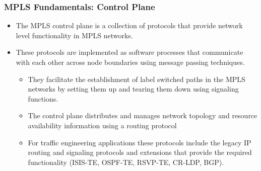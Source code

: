 \documentclass[12pt]{beamer}
\begin{document}
\begin{frame}
	\frametitle{MPLS Fundamentals: Control Plane}
	\begin{itemize}
	    \item The MPLS control plane is a collection of protocols that provide network level functionality in MPLS networks.
	    \item These protocols are implemented as software processes that communicate with each other across node boundaries using message passing techniques.
    \begin{itemize}
        \item They facilitate the establishment of label switched paths in the MPLS networks by setting them up and tearing them down using signaling functions.
		\item The control plane distributes and manages network topology and resource availability information using a routing protocol
		\item For traffic engineering applications these protocols include the legacy IP routing and signaling protocols and extensions that provide the required functionality (ISIS-TE, OSPF-TE, RSVP-TE, CR-LDP, BGP).
	\end{itemize}
    \end{itemize}
\end{frame}
\end{document}
